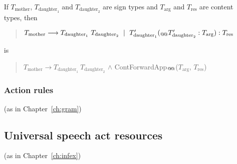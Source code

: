 \begin{description}
  If $T_{\text{mother}}$, $T_{\text{daughter}_1}$ and
  $T_{\text{daughter}_2}$ are sign types and $T_{\text{arg}}$ and
  $T_{\text{res}}$ are content types, then
  \begin{quote}
    $T_{\text{mother}}\longrightarrow
    T_{\text{daughter}_1}\ T_{\text{daughter}_2}\ \mid\
    T_{\text{daughter}_1}'(_{\text{@\!@}}T_{\text{daughter}_2}':T_{\text{arg}}):T_{\text{res}}$
  \end{quote}
  is
  \begin{quote}
  $T_{\text{mother}}\longrightarrow
    T_{\text{daughter}_1}\ T_{\text{daughter}_2}$ \d{\d{$\wedge$}}
    ContForwardApp$_{\text{@\!@}}$($T_{\text{arg}}$, $T_{\text{res}}$)
  \end{quote}  

\end{description}


\subsubsection{Action rules} (as in Chapter~\ref{ch:gram})


  










\subsection{Universal speech act resources} (as in Chapter~\ref{ch:infex})


  
